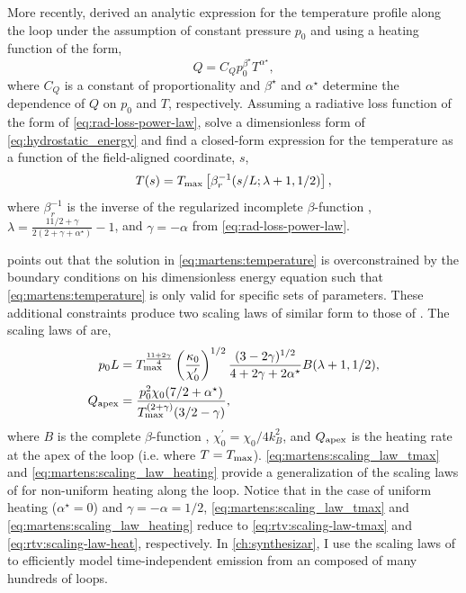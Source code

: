 More recently, \citet{martens_scaling_2010} derived an analytic expression for the temperature profile along the loop under the assumption of constant pressure $p_0$ and using a heating function of the form,
\begin{equation}\label{eq:martens:heating}
    Q = C_Qp_0^{\beta^\star}T^{\alpha^\star}, 
\end{equation}
where $C_Q$ is a constant of proportionality and $\beta^\star$ and $\alpha^\star$ determine the dependence of $Q$ on $p_0$ and $T$, respectively. Assuming a radiative loss function of the form of \autoref{eq:rad-loss-power-law}, \citeauthor{martens_scaling_2010} solve a dimensionless form of \autoref{eq:hydrostatic_energy} and find a closed-form expression for the temperature as a function of the field-aligned coordinate, $s$,
\begin{equation}\label{eq:martens:temperature}
    T(s) = T_\textup{max}\left[\beta_r^{-1}(s/L;\lambda+1,1/2)\right],
\end{equation}
where $\beta_r^{-1}$ is the inverse of the regularized incomplete $\beta$-function \citep[see Section 6.6 of][]{abramowitz_handbook_1972}, $\lambda=\frac{11/2+\gamma}{2(2 + \gamma + \alpha^\star)} - 1$, and $\gamma = -\alpha$ from \autoref{eq:rad-loss-power-law}.

\citet{martens_scaling_2010} points out that the solution in \autoref{eq:martens:temperature} is overconstrained by the boundary conditions on his dimensionless energy equation such that \autoref{eq:martens:temperature} is only valid for specific sets of parameters. These additional constraints produce two scaling laws of similar form to those of \citet{rosner_dynamics_1978,serio_dynamics_1991}. The scaling laws of \citet{martens_scaling_2010} are,
\begin{align}
    p_0L &= T_\textup{max}^{\frac{11+2\gamma}{4}} \left(\frac{\kappa_0}{\chi_0^\prime}\right)^{1/2}\frac{(3-2\gamma)^{1/2}}{4 + 2\gamma + 2\alpha^\star} B(\lambda + 1, 1/2), \label{eq:martens:scaling_law_tmax} \\
    Q_\textup{apex} &= \frac{p_0^2\chi_0(7/2 + \alpha^\star)}{T_\textup{max}^{(2+\gamma)}(3/2 - \gamma)}, \label{eq:martens:scaling_law_heating}
\end{align}
where $B$ is the complete $\beta$-function \citep[see Equation 6.2.1 of][]{abramowitz_handbook_1972}, $\chi_0^\prime=\chi_0/4k_B^2$, and $Q_\textup{apex}$ is the heating rate at the apex of the loop (i.e. where $T=T_\textup{max}$). \autoref{eq:martens:scaling_law_tmax} and \autoref{eq:martens:scaling_law_heating} provide a generalization of the scaling laws of \citet{rosner_dynamics_1978} for non-uniform heating along the loop. Notice that in the case of uniform heating ($\alpha^\star=0$) and $\gamma=-\alpha=1/2$, \autoref{eq:martens:scaling_law_tmax} and \autoref{eq:martens:scaling_law_heating} reduce to \autoref{eq:rtv:scaling-law-tmax} and \autoref{eq:rtv:scaling-law-heat}, respectively. In \autoref{ch:synthesizar}, I use the scaling laws of \citet{martens_scaling_2010} to efficiently model time-independent emission from an \AR{} composed of many hundreds of loops.  


